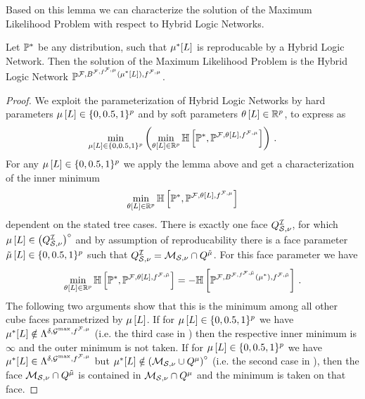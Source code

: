 Based on this lemma we can characterize the solution of the Maximum Likelihood Problem  with respect to Hybrid Logic Networks.

\begin{theorem}
    Let $\mathbb{P}^*$ be any distribution, such that $\mu^*[L]$ is reproducable by a Hybrid Logic Network.
    Then the solution of the Maximum Likelihood Problem  is the Hybrid Logic Network $\mathbb{P}^{\mathcal{F},B^{\mathcal{F},f^{\mathcal{F},\mu}}(\mu^*[L]),f^{\mathcal{F},\mu}}$.
\end{theorem}
\begin{proof}
    We exploit the parameterization of Hybrid Logic Networks by hard parameters $\mu\left[L\right]\in\{0,0.5,1\}^p$ and by soft parameters $\theta\left[L\right]\in\mathbb{R}^{p}$, to express  as
    \begin{align*}
        \min_{\mu\left[L\right]\in\{0,0.5,1\}^p}\left(\min_{\theta\left[L\right]\in\mathbb{R}^{p}} \mathbb{H}\left[\mathbb{P}^*,\mathbb{P}^{\mathcal{F},\theta\left[L\right],f^{\mathcal{F},\mu}}\right]\right) \, .
    \end{align*}
    For any $\mu\left[L\right]\in\{0,0.5,1\}^p$ we apply the lemma above and get a characterization of the inner minimum
    \begin{align*}
        \min_{\theta\left[L\right]\in\mathbb{R}^{p}} \mathbb{H}\left[\mathbb{P}^*,\mathbb{P}^{\mathcal{F},\theta\left[L\right],f^{\mathcal{F},\mu}}\right]
    \end{align*}
    dependent on the stated tree cases.
    There is exactly one face $Q^{\mathcal{I}}_{\mathcal{S},\nu}$, for which $\mu\left[L\right]\in{\left(Q^{\mathcal{I}}_{\mathcal{S},\nu}\right)}^{\circ}$ and by assumption of reproducability there is a face parameter $\tilde{\mu}\left[L\right]\in\{0,0.5,1\}^p$ such that $Q^{\mathcal{I}}_{\mathcal{S},\nu}=\mathcal{M}_{\mathcal{S},\nu}\cap Q^{\tilde{\mu}}$.
    For this face parameter we have
    \begin{align*}
        \min_{\theta\left[L\right]\in\mathbb{R}^{p}} \mathbb{H}\left[\mathbb{P}^*,\mathbb{P}^{\mathcal{F},\theta\left[L\right],f^{\mathcal{F},\tilde{\mu}}}\right]
        = -\mathbb{H}\left[\mathbb{P}^{\mathcal{F},B^{\mathcal{F},f^{\mathcal{F},\tilde{\mu}}}(\mu^*),f^{\mathcal{F},\tilde{\mu}}}\right] \, .
    \end{align*}
    The following two arguments show that this is the minimum among all other cube faces parametrized by $\mu\left[L\right]$.
    If for $\mu\left[L\right]\in\{0,0.5,1\}^p$ we have $\mu^*[L]\notin\Lambda^{\delta,\mathcal{G}^{\mathrm{max}},f^{\mathcal{F},\mu}}$ (i.e. the third case in ) then the respective inner minimum is $\infty$ and the outer minimum is not taken.
    If for $\mu\left[L\right]\in\{0,0.5,1\}^p$ we have $\mu^*[L]\in\Lambda^{\delta,\mathcal{G}^{\mathrm{max}},f^{\mathcal{F},\mu}}$ but $\mu^*[L]\notin{\left(\mathcal{M}_{\mathcal{S},\nu}\cup Q^{\mu}\right)}^{\circ}$ (i.e. the second case in ), then the face $\mathcal{M}_{\mathcal{S},\nu}\cap Q^{\tilde{\mu}}$ is contained in $\mathcal{M}_{\mathcal{S},\nu}\cap Q^{\mu}$ and the minimum is taken on that face.
\end{proof}


